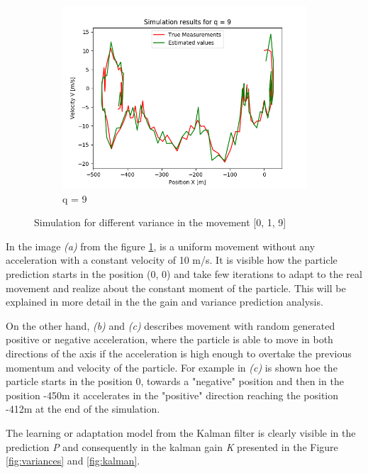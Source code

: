 \documentclass{article}
\begin{document}
\begin{figure}[H]
\begin{subfigure} {.3\textwidth}
                \includegraphics[width=0.9\linewidth]{./img/q_9.png}
                \caption{q = 9}
            \end{subfigure}
            \caption{Simulation for different variance in the movement [0, 1, 9]}
            \label{fig:movement}
        \end{figure}

        In the image \textit{(a)} from the figure \ref{fig:movement}, is a uniform movement without any acceleration with a constant
        velocity of 10 m/s. It is visible how the particle prediction starts in the position (0, 0) and take few iterations to adapt 
        to the real movement and realize about the constant moment of the particle. This will be explained in more detail in the the 
        gain and variance prediction analysis.

        On the other hand, \textit{(b)} and \textit{(c)} describes movement with random generated positive or negative acceleration,
        where the particle is able to move in both directions of the axis if the acceleration is high enough  to overtake the previous momentum and
        velocity of the particle. For example in \textit{(c)} is shown hoe the particle starts in the position 0, towards a "negative" position and
        then in the position -450m it accelerates in the "positive" direction reaching the position -412m at the end of the simulation.

        The learning or adaptation model from the Kalman filter is clearly visible in the prediction \textit{P} and consequently in the kalman gain \textit{K} 
        presented in the Figure \ref{fig:variances} and \ref{fig:kalman}.
\end{document}
